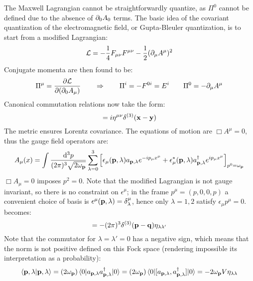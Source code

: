 The Maxwell Lagrangian  cannot be straightforwardly quantize, as $ \Pi^0 $ cannot be defined due to the absence of $ \partial_0 A_0 $ terms. The basic idea of the covariant quantization of the electromagnetic field, or Gupta-Bleuler quantization, is to start from a modified Lagrangian:
\begin{equation}
  \mathcal{L} = - \frac{1}{4} F_{\mu \nu} F^{\mu \nu} - \frac{1}{2} (\partial_\mu A^\mu)^2
\end{equation}
Conjugate momenta are then found to be:
\begin{equation*}
  \Pi^\mu = \frac{\partial \mathcal{L}}{\partial (\partial_0 A_\mu)}
  \qquad \Rightarrow \qquad
  \Pi^i = - F^{0i} = E^i
  \qquad
  \Pi^0 = - \partial_\mu A^\mu
\end{equation*}
Canonical commutation relations now take the form:
\begin{equation}
  [A^\mu(t,\ve{x}) , \Pi^\nu(t,\ve{y})] = i \eta^{\mu \nu} \delta^{(3)}(\ve{x} - \ve{y})
  \label{eq:qed-canon-comm-rel-1}
\end{equation}
The metric ensures Lorentz covariance. The equations of motion are $ \Box A^\mu = 0 $, thus the gauge field operators are:
\begin{equation}
  A_\mu(x) = \int \frac{\mathrm{d}^3p}{(2\pi)^3 \sqrt{2\omega_{\mathbf{p}}}} \sum_{\lambda = 0}^{3} \left[ \epsilon_\mu(\mathbf{p},\lambda) a_{\mathbf{p},\lambda} e^{-i p_\mu x^\mu} + \epsilon_\mu^*(\mathbf{p},\lambda) a_{\mathbf{p},\lambda}^\dagger e^{i p_\mu x^\mu} \right]_{p^0 = \omega_{\mathbf{p}}}
  \label{eq:qed-gauge-fourier}
\end{equation}
$ \Box A_\mu = 0 $ imposes $ p^2 = 0 $. Note that the modified Lagrangian is not gauge invariant, so there is no constraint on $ \epsilon^\mu $; in the frame $ p^\mu = (p,0,0,p) $ a convenient choice of basis is $ \epsilon^\mu(\mathbf{p},\lambda) = \delta^\mu_\lambda $, hence only $ \lambda = 1,2 $ satisfy $ \epsilon_\mu p^\mu = 0 $.  becomes:
\begin{equation}
  [a_{\ve{p},\lambda} , a_{\ve{p},\lambda'}\dg] = - (2\pi)^3 \delta^{(3)}(\ve{p} - \ve{q}) \eta_{\lambda \lambda'}
\end{equation}
Note that the commutator for $ \lambda = \lambda' = 0 $ has a negative sign, which means that the norm is not positive defined on this Fock space (rendering impossible its interpretation as a probability):
\begin{equation}
  \braket{\mathbf{p} , \lambda | \mathbf{p} , \lambda} = (2\omega_{\mathbf{p}}) \braket{0 | a_{\mathbf{p},\lambda} a_{\mathbf{p},\lambda}^\dagger | 0} = (2\omega_{\mathbf{p}}) \braket{0 | [a_{\mathbf{p},\lambda} , a_{\mathbf{p},\lambda}^\dagger] | 0} = - 2\omega_{\mathbf{p}} V \eta_{\lambda \lambda}
\end{equation}
